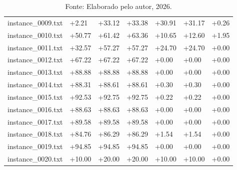 \begin{table}[H]
\begin{minipage}{\textwidth}
{\begin{tabular}{l | l | l | l | l | l | l}
        instance\_0009.txt & \textcolor{green!50!black}{+2.21} & \textcolor{green!50!black}{+33.12} & \textcolor{green!50!black}{+33.38} & \textcolor{green!50!black}{+30.91} & \textcolor{green!50!black}{+31.17} & \textcolor{green!50!black}{+0.26} \\
        \rowcolor{gray!20} instance\_0010.txt & \textcolor{green!50!black}{+50.77} & \textcolor{green!50!black}{+61.42} & \textcolor{green!50!black}{+63.36} & \textcolor{green!50!black}{+10.65} & \textcolor{green!50!black}{+12.60} & \textcolor{green!50!black}{+1.95} \\
        instance\_0011.txt & \textcolor{green!50!black}{+32.57} & \textcolor{green!50!black}{+57.27} & \textcolor{green!50!black}{+57.27} & \textcolor{green!50!black}{+24.70} & \textcolor{green!50!black}{+24.70} & +0.00 \\
        \rowcolor{gray!20} instance\_0012.txt & \textcolor{green!50!black}{+67.22} & \textcolor{green!50!black}{+67.22} & \textcolor{green!50!black}{+67.22} & +0.00 & +0.00 & +0.00 \\
        instance\_0013.txt & \textcolor{green!50!black}{+88.88} & \textcolor{green!50!black}{+88.88} & \textcolor{green!50!black}{+88.88} & +0.00 & +0.00 & +0.00 \\
        \rowcolor{gray!20} instance\_0014.txt & \textcolor{green!50!black}{+88.31} & \textcolor{green!50!black}{+88.61} & \textcolor{green!50!black}{+88.61} & \textcolor{green!50!black}{+0.30} & \textcolor{green!50!black}{+0.30} & +0.00 \\
        instance\_0015.txt & \textcolor{green!50!black}{+92.53} & \textcolor{green!50!black}{+92.75} & \textcolor{green!50!black}{+92.75} & \textcolor{green!50!black}{+0.22} & \textcolor{green!50!black}{+0.22} & +0.00 \\
        \rowcolor{gray!20} instance\_0016.txt & \textcolor{green!50!black}{+88.63} & \textcolor{green!50!black}{+88.63} & \textcolor{green!50!black}{+88.63} & +0.00 & +0.00 & +0.00 \\
        instance\_0017.txt & \textcolor{green!50!black}{+89.58} & \textcolor{green!50!black}{+89.58} & \textcolor{green!50!black}{+89.58} & +0.00 & +0.00 & +0.00 \\
        \rowcolor{gray!20} instance\_0018.txt & \textcolor{green!50!black}{+84.76} & \textcolor{green!50!black}{+86.29} & \textcolor{green!50!black}{+86.29} & \textcolor{green!50!black}{+1.54} & \textcolor{green!50!black}{+1.54} & +0.00 \\
        instance\_0019.txt & \textcolor{green!50!black}{+94.85} & \textcolor{green!50!black}{+94.85} & \textcolor{green!50!black}{+94.85} & +0.00 & +0.00 & +0.00 \\
        \rowcolor{gray!20} instance\_0020.txt & \textcolor{green!50!black}{+10.00} & \textcolor{green!50!black}{+20.00} & \textcolor{green!50!black}{+20.00} & \textcolor{green!50!black}{+10.00} & \textcolor{green!50!black}{+10.00} & +0.00 \\
        \hline
      \end{tabular}
    }
    \caption*{\footnotesize Fonte: Elaborado pelo autor, 2026.}
  \end{minipage}
\end{table}
